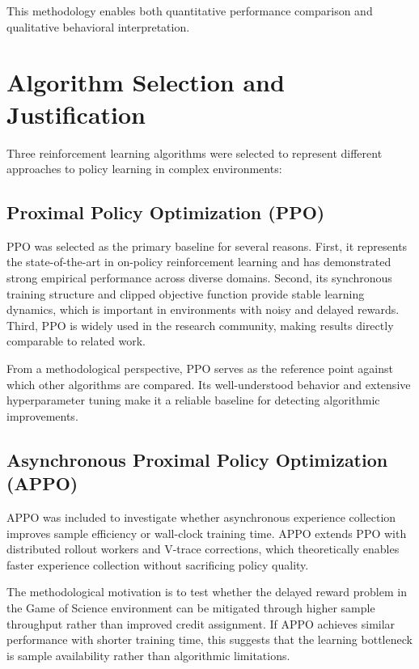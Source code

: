 \documentclass[english,bachelor]{hsluthesis}
\begin{document}
This methodology enables both quantitative performance comparison and qualitative behavioral interpretation.

\section{Algorithm Selection and Justification}

Three reinforcement learning algorithms were selected to represent different approaches to policy learning in complex environments:

\subsection{Proximal Policy Optimization (PPO)}

PPO was selected as the primary baseline for several reasons. First, it represents the state-of-the-art in on-policy reinforcement learning and has demonstrated strong empirical performance across diverse domains. Second, its synchronous training structure and clipped objective function provide stable learning dynamics, which is important in environments with noisy and delayed rewards. Third, PPO is widely used in the research community, making results directly comparable to related work.

From a methodological perspective, PPO serves as the reference point against which other algorithms are compared. Its well-understood behavior and extensive hyperparameter tuning make it a reliable baseline for detecting algorithmic improvements.

\subsection{Asynchronous Proximal Policy Optimization (APPO)}

APPO was included to investigate whether asynchronous experience collection improves sample efficiency or wall-clock training time. APPO extends PPO with distributed rollout workers and V-trace corrections, which theoretically enables faster experience collection without sacrificing policy quality.

The methodological motivation is to test whether the delayed reward problem in the Game of Science environment can be mitigated through higher sample throughput rather than improved credit assignment. If APPO achieves similar performance with shorter training time, this suggests that the learning bottleneck is sample availability rather than algorithmic limitations.
\end{document}
